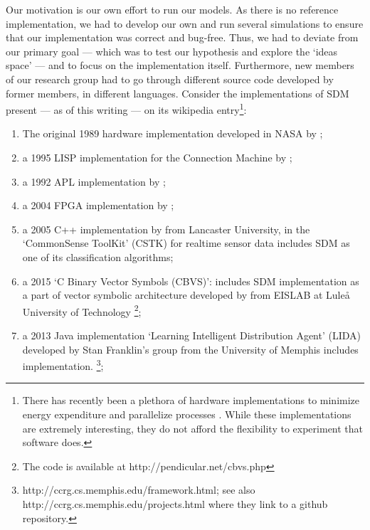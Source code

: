 Our motivation is our own effort to run our models. As there is no reference implementation, we had to develop our own and run several simulations to ensure that our implementation was correct and bug-free. Thus, we had to deviate from our primary goal --- which was to test our hypothesis and explore the `ideas space' --- and to focus on the implementation itself. Furthermore, new members of our research group had to go through different source code developed by former members, in different languages.  Consider the implementations of SDM present --- as of this writing --- on its wikipedia entry\citep{noauthor_sparse_2018}\footnote{There has recently been a plethora of hardware implementations to minimize energy expenditure and parallelize processes \citep{kang_energy-efficient_2015, kang_-memory_2016, li_hyperdimensional_2016, montagna_pulp-hd:_2018, salahuddin_energy_nodate}.  While these implementations are extremely interesting, they do not afford the flexibility to experiment that software does.}:

\begin{enumerate}
    \item The original 1989 hardware implementation developed in NASA by \citet{flynn_sparse_1989};

    \item a 1995 LISP implementation for the Connection Machine by \citet{turk_kanervas_1995};

    \item a 1992 APL implementation by \citet{surkan_wsdm:_1992};

    \item a 2004 FPGA implementation by \citet{silva_reconfigurable_2004};

    \item a 2005 C++ implementation by \citet{berchtold_processing_2005} from Lancaster University, in the `CommonSense ToolKit' (CSTK) \citep{noauthor_cstk:_nodate} for realtime sensor data includes SDM as one of its classification algorithms;

    \item  a 2015 `C Binary Vector Symbols (CBVS)':  includes SDM implementation as a part of  vector symbolic architecture developed by \citet{emruli_vector_2015} from EISLAB at Luleå University of Technology \footnote{The code is available at http://pendicular.net/cbvs.php};

    \item a 2013 Java implementation `Learning Intelligent Distribution Agent' (LIDA) developed by \citep{franklin_lida:_2014, snaider_integer_2013, snaider_modular_2014} Stan Franklin's group from the University of Memphis includes implementation. \footnote{http://ccrg.cs.memphis.edu/framework.html; see also http://ccrg.cs.memphis.edu/projects.html where they link to a github repository.};

\end{enumerate}

